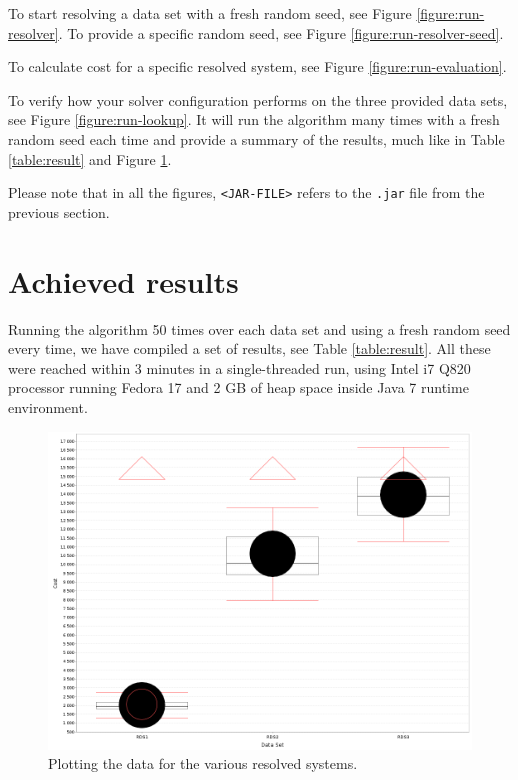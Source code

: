 \documentclass[10pt,a4paper,final]{article}
\begin{document}
To start resolving a data set with a fresh random seed, see Figure \ref{figure:run-resolver}. To provide a specific random seed, see Figure \ref{figure:run-resolver-seed}.

To calculate cost for a specific resolved system, see Figure \ref{figure:run-evaluation}.

To verify how your solver configuration performs on the three provided data sets, see Figure \ref{figure:run-lookup}. It will run the algorithm many times with a fresh random seed each time and provide a summary of the results, much like in Table \ref{table:result} and Figure \ref{figure:plot}.

Please note that in all the figures, \texttt{<JAR-FILE>} refers to the \texttt{.jar} file from the previous section.

\section{Achieved results}

Running the algorithm 50 times over each data set and using a fresh random seed every time, we have compiled a set of results, see Table \ref{table:result}. All these were reached within 3 minutes in a single-threaded run, using Intel i7 Q820 processor running Fedora 17 and 2 GB of heap space inside Java 7 runtime environment.



\begin{figure}
\centering
\includegraphics[width=120mm]{chart.png}
\caption{Plotting the data for the various resolved systems.}
\label{figure:plot}
\end{figure}
\end{document}

